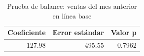 
\begin{longtable}[t]{rrr}
\caption{Prueba de balance: ventas del mes anterior en línea base}\\
\toprule
Coeficiente & Error estándar & Valor p\\
\midrule
127.98 & 495.55 & 0.7962\\
\bottomrule
\end{longtable}
